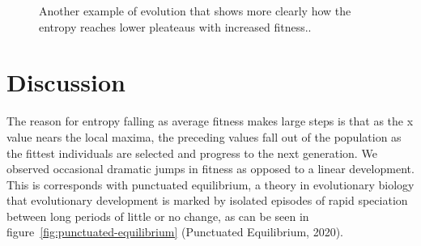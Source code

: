 \documentclass[11pt]{article}
\begin{document}
\begin{figure}[h!]
  \centering
  \caption{Another example of evolution that shows more clearly how
    the entropy reaches lower pleateaus with increased fitness..}
  \label{fig:gen-info_pid3027915}
\end{figure}




\section{Discussion}
\label{sec:org7999995}

The reason for entropy falling as average fitness makes large steps is
 that as the x value nears the local maxima, the
preceding values fall out of the population as the fittest individuals
are selected and progress to the next generation. We observed 
occasional dramatic jumps
in fitness as opposed to a linear development. This is corresponds
with punctuated equilibrium, a theory in evolutionary biology that
evolutionary development is marked by isolated episodes of rapid
speciation between long periods of little or no change, as can be 
seen in figure~\ref{fig:punctuated-equilibrium} (Punctuated
Equilibrium, 2020).
\end{document}
